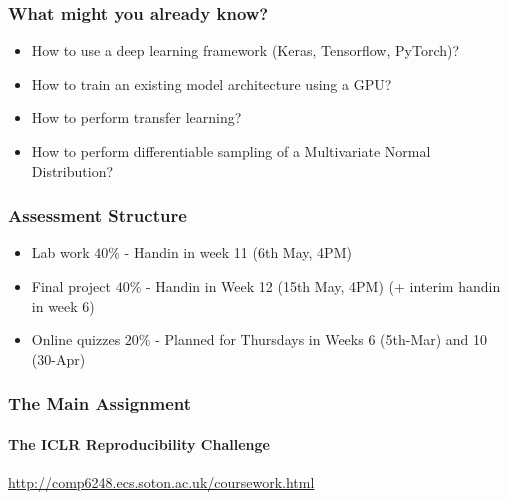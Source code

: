 \documentclass[\beamerclass]{beamer}
\begin{document}
\begin{frame}
	\frametitle{What might you already know?}	
	\begin{itemize}
	\item<+-> How to use a deep learning framework (Keras, Tensorflow, PyTorch)?
	\item<+-> How to train an existing model architecture using a GPU?
	\item<+-> How to perform transfer learning?
	\item<+-> How to perform differentiable sampling of a Multivariate Normal Distribution?
	\end{itemize}
\end{frame}

\begin{frame}
	\frametitle{Assessment Structure}
	\begin{itemize}
		\item Lab work $40\%$ - Handin in week 11 (6th May, 4PM)
		\item Final project $40\%$  - Handin in Week 12 (15th May, 4PM) (+ interim handin in week 6)
		\item Online quizzes $20\%$ - Planned for Thursdays in Weeks 6 (5th-Mar) and 10 (30-Apr) 
	\end{itemize}
\end{frame}

	
	

\begin{frame}
	\frametitle{The Main Assignment}
	\framesubtitle{The ICLR Reproducibility Challenge}
	\url{http://comp6248.ecs.soton.ac.uk/coursework.html}
\end{frame}
\end{document}

